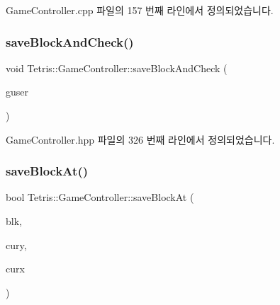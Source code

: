 Game\+Controller.\+cpp 파일의 157 번째 라인에서 정의되었습니다.

\mbox{\label{class_tetris_1_1_game_controller_a3c63a9754e4cbeae4f66a5760bb4055d}} 
\subsubsection{\texorpdfstring{save\+Block\+And\+Check()}{saveBlockAndCheck()}\hspace{0.1cm}{\footnotesize\ttfamily [2/2]}}
{\footnotesize\ttfamily void Tetris\+::\+Game\+Controller\+::save\+Block\+And\+Check (\begin{DoxyParamCaption}\item[{\hyperlink{class_tetris_1_1_users_1_1_game_user}{Users\+::\+Game\+User} $\ast$}]{guser }\end{DoxyParamCaption})\hspace{0.3cm}{\ttfamily [inline]}}



Game\+Controller.\+hpp 파일의 326 번째 라인에서 정의되었습니다.

\mbox{\label{class_tetris_1_1_game_controller_adc067380df0f0da4ea4a358d00d6a123}} 
\subsubsection{\texorpdfstring{save\+Block\+At()}{saveBlockAt()}\hspace{0.1cm}{\footnotesize\ttfamily [1/2]}}
{\footnotesize\ttfamily bool Tetris\+::\+Game\+Controller\+::save\+Block\+At (\begin{DoxyParamCaption}\item[{\hyperlink{class_tetris_1_1_block}{Block} $\ast$}]{blk,  }\item[{unsigned short}]{cury,  }\item[{unsigned short}]{curx }\end{DoxyParamCaption})\hspace{0.3cm}{\ttfamily [protected]}}



